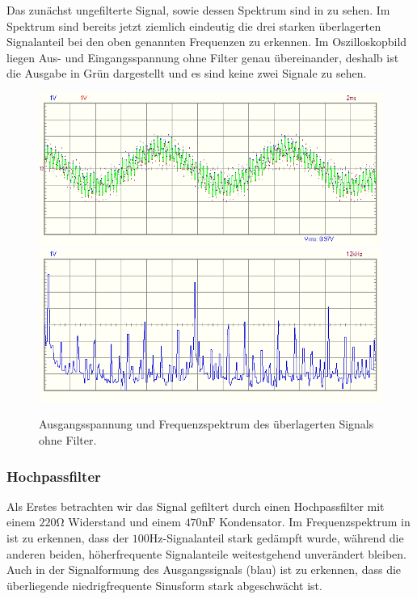 Das zunächst ungefilterte Signal, sowie dessen Spektrum sind in  zu sehen. Im Spektrum sind bereits jetzt ziemlich eindeutig die drei starken überlagerten Signalanteil bei den oben genannten Frequenzen zu erkennen. Im Oszilloskopbild liegen Aus- und Eingangsspannung ohne Filter genau übereinander, deshalb ist die Ausgabe in Grün dargestellt und es sind keine zwei Signale zu sehen.

\begin{figure}[H]
  \centering
  \includegraphics[width=.9\textwidth]{files/aufgabe8_teil1_osz.png}
  \includegraphics[width=.9\textwidth]{files/aufgabe8_teil1_spectrum.png}
  \caption{Ausgangsspannung und Frequenzspektrum des überlagerten Signals ohne Filter.}
  \label{fig:aufgabe8_teil1_osz}
\end{figure}

\newpage
\subsubsection*{Hochpassfilter}
Als Erstes betrachten wir das Signal gefiltert durch einen Hochpassfilter mit einem $220\si{\ohm}$ Widerstand und einem $470\si{\nano\farad}$ Kondensator. Im Frequenzspektrum in  ist zu erkennen, dass der $100\si{\hertz}$-Signalanteil stark gedämpft wurde, während die anderen beiden, höherfrequente Signalanteile weitestgehend unverändert bleiben. Auch in der Signalformung des Ausgangssignals (blau) ist zu erkennen, dass die überliegende niedrigfrequente Sinusform stark abgeschwächt ist.



